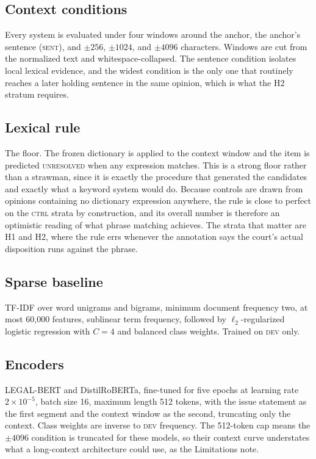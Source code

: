 \subsection{Context conditions} Every system is evaluated under four windows
around the anchor, the anchor's sentence (\textsc{sent}), and $\pm256$, $\pm1024$,
and $\pm4096$ characters. Windows are cut from the normalized text and
whitespace-collapsed. The sentence condition isolates local lexical evidence, and
the widest condition is the only one that routinely reaches a later holding
sentence in the same opinion, which is what the H2 stratum requires.

\subsection{Lexical rule} The floor. The frozen dictionary is applied to the
context window and the item is predicted \textsc{unresolved} when any expression
matches. This is a strong floor rather than a strawman, since it is exactly the
procedure that generated the candidates and exactly what a keyword system would
do. Because controls are drawn from opinions containing no dictionary expression
anywhere, the rule is close to perfect on the \textsc{ctrl} strata by
construction, and its overall number is therefore an optimistic reading of what
phrase matching achieves. The strata that matter are H1 and H2, where the rule
errs whenever the annotation says the court's actual disposition runs against the
phrase.

\subsection{Sparse baseline} TF-IDF over word unigrams and bigrams, minimum
document frequency two, at most 60{,}000 features, sublinear term frequency,
followed by $\ell_2$-regularized logistic regression with $C=4$ and balanced
class weights. Trained on \textsc{dev} only.

\subsection{Encoders} LEGAL-BERT \citep{chalkidis2020legalbert} and
DistilRoBERTa, fine-tuned for five epochs at learning rate $2\times10^{-5}$,
batch size 16, maximum length 512 tokens, with the issue statement as the first
segment and the context window as the second, truncating only the context. Class
weights are inverse to \textsc{dev} frequency. The 512-token cap means the
$\pm4096$ condition is truncated for these models, so their context curve
understates what a long-context architecture could use, as the Limitations note.

